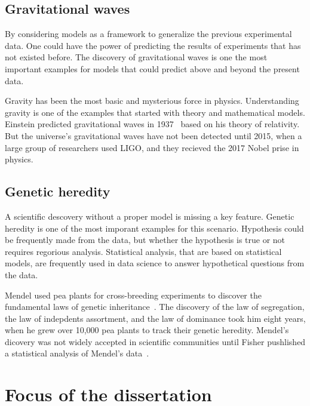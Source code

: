\subsection{Gravitational waves}

By considering models as a framework to generalize the previous experimental data. 
One could have the power of predicting the results of experiments that has not existed before.
The discovery of gravitational waves is one the most important examples for models that could predict above and beyond the present data.

Gravity has been the most basic and mysterious force in physics.
Understanding gravity is one of the examples that started with theory and mathematical models. 
Einstein predicted gravitational waves in 1937~\cite{einstein1937gravitational} based on his theory of relativity. 
But the universe's gravitational waves have not been detected until 2015, when a large group of researchers used \ac{LIGO}, and they recieved the 2017 Nobel prise in physics.



\subsection{Genetic heredity}

A scientific descovery without a proper model is missing a key feature. 
Genetic heredity is one of the most imporant examples for this scenario. 
Hypothesis could be frequently made from the data, but whether the hypothesis is true or not requires regorious analysis.
Statistical analysis, that are based on statistical models, are frequently used in data science to answer hypothetical questions from the data.

Mendel used pea plants for cross-breeding experiments to discover the fundamental laws of genetic inheritance~\cite{mendel1996experiments}.
The discovery of the law of segregation, the law of indepdents assortment, and the law of dominance took him eight years, when he grew over 10,000 pea plants to track their genetic heredity.
Mendel's dicovery was not widely accepted in scientific communities until Fisher pushlished a statistical analysis of Mendel's data~\cite{fisher1919xv}.

\section{Focus of the dissertation}

